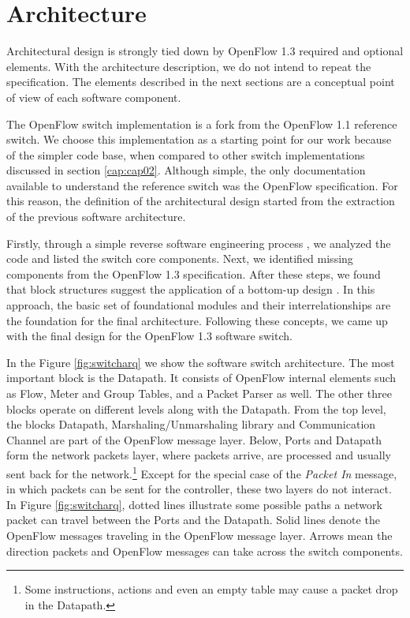 \chapter{Architecture}
\label{cap:cap03}

Architectural design is strongly tied down by OpenFlow 1.3 required and optional elements. With the architecture description, we do not intend to repeat the specification. The elements described in the next sections are a conceptual point of view of each software component. 

The OpenFlow switch implementation is a fork from the OpenFlow 1.1 reference switch. We choose this implementation as a starting point for our work because of the simpler code base, when compared to other switch implementations discussed in section \ref{cap:cap02}. Although simple, the only documentation available to understand the reference switch was the OpenFlow specification. For this reason, the definition of the architectural design started from the extraction of the previous software architecture. 

Firstly, through a simple reverse software engineering process \cite{Sommerville:2001:SE:375369}, we analyzed the code and listed the switch core components. Next, we identified missing components from the OpenFlow 1.3 specification. After these steps, we found that block structures suggest the application of a bottom-up design \cite{vonMayrhauser:1990:SEM:79005}. In this approach, the basic set of foundational modules and their interrelationships are the foundation for the final architecture. Following these concepts, we came up with the final design for the OpenFlow 1.3 software switch.

In the Figure \ref{fig:switcharq} we show the software switch architecture. The most important block is the Datapath. It consists of OpenFlow internal elements such as Flow, Meter and Group Tables, and a Packet Parser as well. The other three blocks operate on different levels along with the Datapath. From the top level, the blocks Datapath, Marshaling/Unmarshaling library and Communication Channel are part of the OpenFlow message layer. Below, Ports and Datapath form the network packets layer, where packets arrive, are processed and usually sent back for the network.\footnote{Some instructions, actions and even an empty table may cause a packet drop in the Datapath.} Except for the special case of the \textit{Packet In} message, in which packets can be sent for the controller, these two layers do not interact. In Figure \ref{fig:switcharq}, dotted lines illustrate some possible paths a network packet can travel between the Ports and the Datapath. Solid lines denote the OpenFlow messages traveling in the OpenFlow message layer. Arrows mean the direction packets and OpenFlow messages can take across the switch components. 


